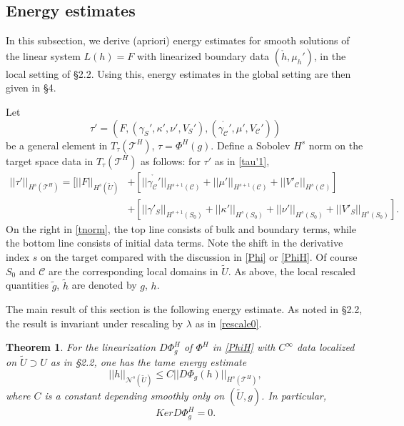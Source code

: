 \documentclass[10pt]{amsart}
\newcommand{\g}{\gamma}
\renewcommand{\k}{\kappa}
\renewcommand{\l}{\lambda}
\newcommand{\cC}{{\mathcal C}}
\newcommand{\cT}{{\mathcal T}}
\newcommand{\cN}{{\mathcal N}}
\newcommand{\be}{\begin{equation}}
\newcommand{\ee}{\end{equation}}
\newcommand{\<}{\langle}
\renewcommand{\>}{\rangle}
\newcommand{\w}{\widetilde}
\theoremstyle{plain}
\newtheorem{theorem}[lemma]{Theorem}
\theoremstyle{remark}
\theoremstyle{definition}
\numberwithin{equation}{section}
\begin{document}
      
\subsection{Energy estimates}

   In this subsection, we derive (apriori) energy estimates for smooth solutions of the linear system $L(h) = F$ with linearized boundary 
data $(\ring{h}, \mu_h')$, in the local setting of \S 2.2. Using this, energy estimates in the global setting are then 
given in \S 4. 

 Let 
\be \label{tau'1}
\tau' = (F, (\g_S', \k', \nu', V_S'), (\ring{\g_{\cC}'}, \mu', V_{\cC}')) 
\ee
be a general element in $T_{\tau}(\cT^H)$, $\tau = \Phi^H(g)$. Define a Sobolev $H^s$ norm on the target space data in $T_{\tau}(\cT^H)$ as follows: 
for $\tau'$ as in \eqref{tau'1},  
\be \label{tnorm}
\begin{split}
||\tau'||_{H^s(\cT^H)} = [ ||F||_{H^s(\w U)} & + [ ||\ring{\g_{\cC}'}||_{H^{s+1}(\cC)} + ||\mu'||_{H^{s+1}(\cC)} + ||V'_{\cC}||_{H^s(\cC)}] \\
& + [ ||\g'_S||_{H^{s+1}(S_0)} + ||\k'||_{H^{s}(S_0)} + ||\nu'||_{H^s(S_0)} + ||V'_S||_{H^s(S_0)} ].
\end{split}
\ee
 On the right in \eqref{tnorm}, the top line consists of bulk and boundary terms, while the bottom line consists of initial data terms. Note the shift in the 
derivative index $s$ on the target compared with the discussion in \eqref{Phi} or \eqref{PhiH}. Of course $S_0$ and $\cC$ are the corresponding 
local domains in $\w U$. As above, the local rescaled quantities $\w g$, $\w h$ are denoted by $g$, $h$. 
 
  The main result of this section is the following energy estimate. As noted in \S 2.2, the result is invariant under rescaling by $\l$ as in \eqref{rescale0}. 

\begin{theorem} \label{Eestthm} 
 For the linearization $D\Phi_g^H$ of $\Phi^H$ in \eqref{PhiH} with $C^{\infty}$ data localized on $\w U \supset U$ 
as in \S 2.2, one has the tame energy estimate 
\be \label{Eest}
||h||_{\cN^s(\w U)}  \leq C||D\Phi_g(h)||_{H^s( \cT^H)},
\ee
where $C$ is a constant depending smoothly only on $(\w U, g)$. In particular, 
$$Ker D\Phi_g^H = 0.$$
\end{theorem} 
\end{document}
